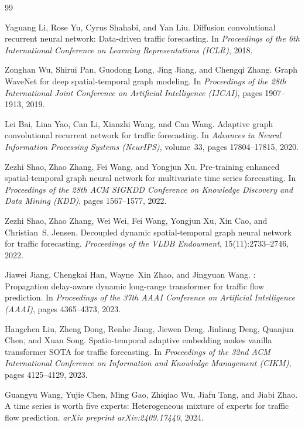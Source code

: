 
\begin{thebibliography}{99}

Yaguang Li, Rose Yu, Cyrus Shahabi, and Yan Liu.
\newblock Diffusion convolutional recurrent neural network: Data-driven traffic
  forecasting.
\newblock In \emph{Proceedings of the 6th International Conference on Learning
  Representations (ICLR)}, 2018.

Zonghan Wu, Shirui Pan, Guodong Long, Jing Jiang, and Chengqi Zhang.
\newblock Graph {WaveNet} for deep spatial-temporal graph modeling.
\newblock In \emph{Proceedings of the 28th International Joint Conference on
  Artificial Intelligence (IJCAI)}, pages 1907--1913, 2019.

Lei Bai, Lina Yao, Can Li, Xianzhi Wang, and Can Wang.
\newblock Adaptive graph convolutional recurrent network for traffic
  forecasting.
\newblock In \emph{Advances in Neural Information Processing Systems
  (NeurIPS)}, volume~33, pages 17804--17815, 2020.

Zezhi Shao, Zhao Zhang, Fei Wang, and Yongjun Xu.
\newblock Pre-training enhanced spatial-temporal graph neural network for
  multivariate time series forecasting.
\newblock In \emph{Proceedings of the 28th ACM SIGKDD Conference on Knowledge
  Discovery and Data Mining (KDD)}, pages 1567--1577, 2022.

Zezhi Shao, Zhao Zhang, Wei Wei, Fei Wang, Yongjun Xu, Xin Cao, and
  Christian~S. Jensen.
\newblock Decoupled dynamic spatial-temporal graph neural network for traffic
  forecasting.
\newblock \emph{Proceedings of the VLDB Endowment}, 15(11):2733--2746, 2022.

Jiawei Jiang, Chengkai Han, Wayne~Xin Zhao, and Jingyuan Wang.
: Propagation delay-aware dynamic long-range transformer
  for traffic flow prediction.
\newblock In \emph{Proceedings of the 37th AAAI Conference on Artificial
  Intelligence (AAAI)}, pages 4365--4373, 2023.

Hangchen Liu, Zheng Dong, Renhe Jiang, Jiewen Deng, Jinliang Deng, Quanjun
  Chen, and Xuan Song.
\newblock Spatio-temporal adaptive embedding makes vanilla transformer {SOTA}
  for traffic forecasting.
\newblock In \emph{Proceedings of the 32nd ACM International Conference on
  Information and Knowledge Management (CIKM)}, pages 4125--4129, 2023.

Guangyu Wang, Yujie Chen, Ming Gao, Zhiqiao Wu, Jiafu Tang, and Jiabi Zhao.
\newblock A time series is worth five experts: Heterogeneous mixture of experts
  for traffic flow prediction.
\newblock \emph{arXiv preprint arXiv:2409.17440}, 2024.

\end{thebibliography}
